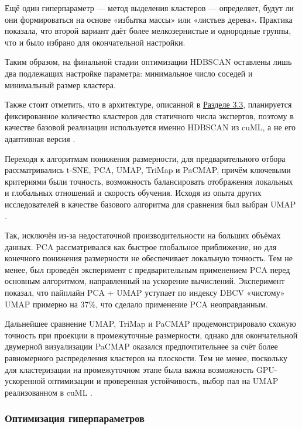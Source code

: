  Ещё один гиперпараметр --- метод выделения кластеров --- определяет, будут ли они формироваться на основе «избытка массы» или «листьев дерева».
 Практика показала, что второй вариант даёт более мелкозернистые и однородные группы, что и было избрано для окончательной настройки.

 Таким образом, на финальной стадии оптимизации HDBSCAN оставлены лишь два подлежащих настройке параметра: минимальное
 число соседей и минимальный размер кластера.

 Также стоит отметить, что в архитектуре, описанной в \hyperref[sec:architecture]{Разделе 3.3},
 планируется фиксированное количество кластеров для статичного числа экспертов,
 поэтому в качестве базовой реализации используется именно HDBSCAN из cuML,
 а не его адаптивная версия \parencite{HDBSCAN2022adaptive}.

 Переходя к алгоритмам понижения размерности, для предварительного отбора рассматривались
 t-SNE, PCA, UMAP, TriMap и PaCMAP, причём ключевыми критериями были точность, возможность
 балансировать отображения локальных и глобальных отношений и скорость обучения. Исходя из опыта
 других исследователей в качестве базового алгоритма для сравнения был выбран UMAP \parencite{BERTopic2022}.

Так, исключён из-за недостаточной производительности на больших объёмах данных. PCA рассматривался как
быстрое глобальное приближение, но для конечного понижения размерности не обеспечивает локальную точность.
Тем не менее, был проведён эксперимент с предварительным применением PCA перед основным алгоритмом,
направленный на ускорение вычислений. Эксперимент показал, что пайплайн PCA + UMAP уступает по индексу
DBCV «чистому» UMAP примерно на 37\%, что сделало применение PCA неоправданным.

Дальнейшее сравнение UMAP, TriMap и PaCMAP продемонстрировало схожую точность при проекции в промежуточные размерности,
однако для окончательной двумерной визуализации PaCMAP оказался предпочтительнее за счёт более равномерного распределения
кластеров на плоскости. Тем не менее, поскольку для кластеризации на промежуточном этапе была важна возможность GPU-ускоренной
оптимизации и проверенная устойчивость, выбор пал на UMAP реализованном в cuML \parencite{cuml2020machine}.

\subsubsection{Оптимизация гиперпараметров}

